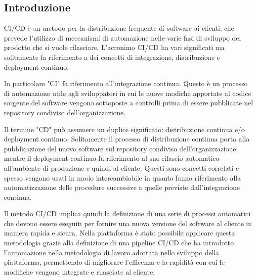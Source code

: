 \subsection{Introduzione}
CI/CD è un metodo per la distribuzione frequente di software ai clienti, che prevede l'utilizzo di meccanismi
di automazione nelle varie fasi di sviluppo del prodotto che si vuole rilasciare.
L'acronimo CI/CD ha vari significati ma solitamente fa riferimento a dei concetti di integrazione, distribuzione
e deployment continuo.

In particolare "CI" fa riferimento all'integrazione continua. Questo è un processo di automazione
utile agli sviluppatori in cui le nuove modiche apportate al codice sorgente del software vengono
sottoposte a controlli prima di essere pubblicate nel repository condiviso dell'organizzazione.

Il termine "CD" può assumere un duplice significato: distribuzione continua e/o deployment continuo.
Solitamente il processo di distribuzione continua porta alla pubblicazione del nuovo software sul repository condiviso dell'organizzazione
mentre il deployment continuo fa riferimento al suo rilascio automatico all'ambiente di produzione e quindi al cliente.
Questi sono concetti correlati e spesso vengono usati in modo intercambiabile in quanto fanno riferimento
alla automatizzazione delle procedure successive a quelle previste dall'integrazione continua.

Il metodo CI/CD implica quindi la definizione di una serie di processi automatici che devono
essere eseguiti per fornire una nuova versione del software al cliente in maniera rapida e sicura.
Nella piattaforma è stato possibile applicare questa metodologia grazie alla definizione di una pipeline CI/CD che ha
introdotto l'automazione nella metodologia di lavoro adottata nello sviluppo
della piattaforma, permettendo di migliorare l'efficenza e la rapidità con cui le modifiche vengono
integrate e rilasciate al cliente.